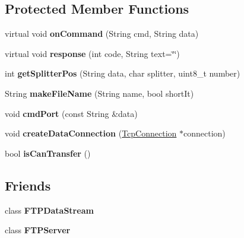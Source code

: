 \subsection*{Protected Member Functions}
\begin{DoxyCompactItemize}
\item 
\hypertarget{class_f_t_p_server_connection_ac2db42bde1c485cb649638eeeba45b55}{}virtual void {\bfseries on\+Command} (String cmd, String data)\label{class_f_t_p_server_connection_ac2db42bde1c485cb649638eeeba45b55}

\item 
\hypertarget{class_f_t_p_server_connection_a0e10956fe9b5eced5d1531c85ed2092c}{}virtual void {\bfseries response} (int code, String text=\char`\"{}\char`\"{})\label{class_f_t_p_server_connection_a0e10956fe9b5eced5d1531c85ed2092c}

\item 
\hypertarget{class_f_t_p_server_connection_a8e537ef40a67def74890e6b0d7e1de3d}{}int {\bfseries get\+Splitter\+Pos} (String data, char splitter, uint8\+\_\+t number)\label{class_f_t_p_server_connection_a8e537ef40a67def74890e6b0d7e1de3d}

\item 
\hypertarget{class_f_t_p_server_connection_a93e4df7c53271118e3975b9f2ee4ba66}{}String {\bfseries make\+File\+Name} (String name, bool short\+It)\label{class_f_t_p_server_connection_a93e4df7c53271118e3975b9f2ee4ba66}

\item 
\hypertarget{class_f_t_p_server_connection_a60d9eea49392714f23d28c88a55c3e4b}{}void {\bfseries cmd\+Port} (const String \&data)\label{class_f_t_p_server_connection_a60d9eea49392714f23d28c88a55c3e4b}

\item 
\hypertarget{class_f_t_p_server_connection_a437c82fc427d5463cc3bc13261a71317}{}void {\bfseries create\+Data\+Connection} (\hyperlink{class_tcp_connection}{Tcp\+Connection} $\ast$connection)\label{class_f_t_p_server_connection_a437c82fc427d5463cc3bc13261a71317}

\item 
\hypertarget{class_f_t_p_server_connection_a92fc4d82fc9c5b3cc3b65adae26d2eae}{}bool {\bfseries is\+Can\+Transfer} ()\label{class_f_t_p_server_connection_a92fc4d82fc9c5b3cc3b65adae26d2eae}

\end{DoxyCompactItemize}
\subsection*{Friends}
\begin{DoxyCompactItemize}
\item 
\hypertarget{class_f_t_p_server_connection_a99e599a35280ac84d2e1f25cafa8d2aa}{}class {\bfseries F\+T\+P\+Data\+Stream}\label{class_f_t_p_server_connection_a99e599a35280ac84d2e1f25cafa8d2aa}

\item 
\hypertarget{class_f_t_p_server_connection_a30283ec79f994d5512e92217a7c033e8}{}class {\bfseries F\+T\+P\+Server}\label{class_f_t_p_server_connection_a30283ec79f994d5512e92217a7c033e8}

\end{DoxyCompactItemize}
